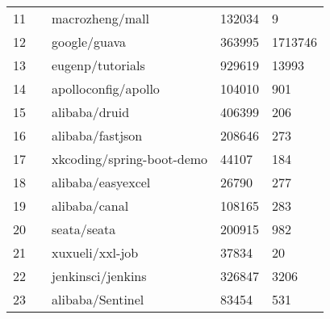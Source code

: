 \begin{table*}
\begin{tabular}{|l|l|l|l|l|}
		11          &                            & macrozheng/mall                                   & 132034                  & 9                       \\  \cline{1-1} \cline{3-5}
		12          &                            & google/guava                                      & 363995                  & 1713746                 \\  \cline{1-1} \cline{3-5}
		13          &                            & eugenp/tutorials                                  & 929619                  & 13993                   \\  \cline{1-1} \cline{3-5}
		14          &                            & apolloconfig/apollo                               & 104010                  & 901                     \\  \cline{1-1} \cline{3-5}
		15          &                            & alibaba/druid                                     & 406399                  & 206                     \\  \cline{1-1} \cline{3-5}
		16          &                            & alibaba/fastjson                                  & 208646                  & 273                     \\  \cline{1-1} \cline{3-5}
		17          &                            & xkcoding/spring-boot-demo                         & 44107                   & 184                     \\  \cline{1-1} \cline{3-5}
		18          &                            & alibaba/easyexcel                                 & 26790                   & 277                     \\  \cline{1-1} \cline{3-5}
		19          &                            & alibaba/canal                                     & 108165                  & 283                     \\  \cline{1-1} \cline{3-5}
		20          &                            & seata/seata                                       & 200915                  & 982                     \\  \cline{1-1} \cline{3-5}
		21          &                            & xuxueli/xxl-job                                   & 37834                   & 20                      \\  \cline{1-1} \cline{3-5}
		22          &                            & jenkinsci/jenkins                                 & 326847                  & 3206                    \\  \cline{1-1} \cline{3-5}
		23          &                            & alibaba/Sentinel                                  & 83454                   & 531                     \\  \cline{1-1} \cline{3-5}

\end{tabular}
\end{table*}
